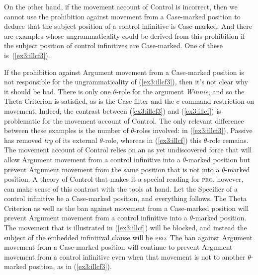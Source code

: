 On the other hand, if the movement account of Control is incorrect, then we cannot use the prohibition against movement from a Case-marked position to deduce that the subject position of a control infinitive is Case-marked. And there are examples whose ungrammaticality could be derived from this prohibition if the subject position of control infinitives are Case-marked. One of these is~(\ref{ex3:illcf3}).
\begin{exe}
\end{exe}
If the prohibition against Argument movement from a Case-marked position is not responsible for the ungrammaticality of (\ref{ex3:illcf3}), then it's not clear why it should be bad. There is only one \mbox{$\theta$-role} for the argument \emph{Winnie}, and so the Theta Criterion is satisfied, as is the Case filter and the c-command restriction on movement. Indeed, the contrast between (\ref{ex3:illcf3}) and (\ref{ex3:illcf}) is problematic for the movement account of Control. The only relevant difference between these examples is the number of \mbox{$\theta$-roles} involved: in (\ref{ex3:illcf3}), Passive has removed \emph{try} of its external \mbox{$\theta$-role}, whereas in (\ref{ex3:illcf}) this \mbox{$\theta$-role} remains. The movement account of Control relies on an as yet undiscovered force that will allow Argument movement from a control infinitive into a \mbox{$\theta$-marked} position but prevent Argument movement from the same position that is not into a \mbox{$\theta$-marked} position. A theory of Control that makes it a special reading for \textsc{pro}, however, can make sense of this contrast with the tools at hand. Let the Specifier of a control infinitive be a Case-marked position, and everything follows. The Theta Criterion as well as the ban against movement from a Case-marked position will prevent Argument movement from a control infinitive into a \mbox{$\theta$-marked} position. The movement that is illustrated in (\ref{ex3:illcf}) will be blocked, and instead the subject of the embedded infinitival clause will be \textsc{pro}. The ban against Argument movement from a Case-marked position will continue to prevent Argument movement from a control infinitive even when that movement is not to another \mbox{$\theta$-marked} position, as in (\ref{ex3:illcf3}). 

